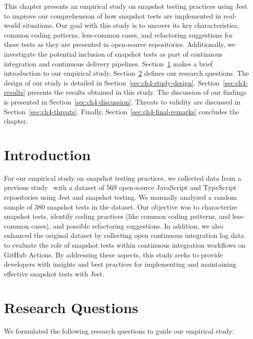 \documentclass[
	msc, %
	english %
]{../ppgccufmg}
\begin{document}
        This chapter presents an empirical study on snapshot testing practices using Jest to improve our comprehension of how snapshot tests are implemented in real-world situations. Our goal with this study is to uncover its key characteristics, common coding patterns, less-common cases, and refactoring suggestions for these tests as they are presented in open-source repositories. Additionally, we investigate the potential inclusion of snapshot tests as part of continuous integration and continuous delivery pipelines. Section~\ref{sec:ch4-introduction} makes a brief introduction to our empirical study. Section~\ref{sec:ch4-rqs} defines our research questions. The design of our study is detailed in Section~\ref{sec:ch4-study-design}. Section~\ref{sec:ch4-results} presents the results obtained in this study. The discussion of our findings is presented in Section~\ref{sec:ch4-discussion}. Threats to validity are discussed in Section~\ref{sec:ch4-threats}. Finally, Section~\ref{sec:ch4-final-remarks} concludes the chapter.
      

    \section{Introduction}\label{sec:ch4-introduction}

        For our empirical study on snapshot testing practices, we collected data from a previous study~\cite{fujita2023empirical} with a dataset of 569 open-source JavaScript and TypeScript repositories using Jest and snapshot testing. We manually analyzed a random sample of 380 snapshot tests in the dataset. Our objective was to characterize snapshot tests, identify coding practices (like common coding patterns, and less-common cases), and possible refactoring suggestions. In addition, we also enhanced the original dataset by collecting open continuous integration log data to evaluate the role of snapshot tests within continuous integration workflows on GitHub Actions. By addressing these aspects, this study seeks to provide developers with insights and best practices for implementing and maintaining effective snapshot tests with Jest.
        

    \section{Research Questions}\label{sec:ch4-rqs}

        We formulated the following research questions to guide our empirical study:\\
  
\end{document}
